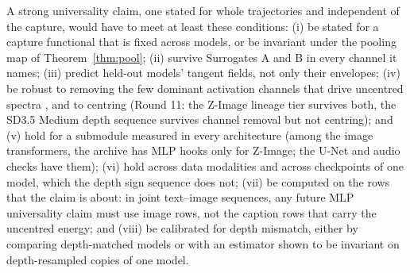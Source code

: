 \documentclass[11pt]{article}
\theoremstyle{definition}
\begin{document}
A strong universality claim, one stated for whole trajectories and independent of the capture, would have to meet at least these conditions: (i) be stated for a capture functional that is fixed across models, or be invariant under the pooling map of Theorem~\ref{thm:pool}; (ii) survive Surrogates A and B in every channel it names; (iii) predict held-out models' tangent fields, not only their envelopes; (iv) be robust to removing the few dominant activation channels that drive uncentred spectra \citep{sun2024massive,turri2026few}, and to centring (Round 11: the Z-Image lineage tier survives both, the SD3.5 Medium depth sequence survives channel removal but not centring); and (v) hold for a submodule measured in every architecture (among the image transformers, the archive has MLP hooks only for Z-Image; the U-Net and audio checks have them); (vi) hold across data modalities and across checkpoints of one model, which the depth sign sequence does not; (vii) be computed on the rows that the claim is about: in joint text--image sequences, any future MLP universality claim must use image rows, not the caption rows that carry the uncentred energy; and (viii) be calibrated for depth mismatch, either by comparing depth-matched models or with an estimator shown to be invariant on depth-resampled copies of one model.
\end{document}
